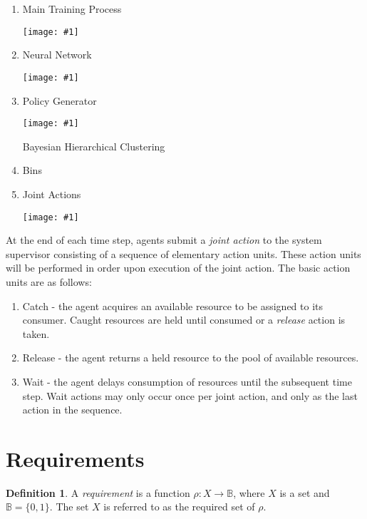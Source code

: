 \documentclass{article}
\theoremstyle{definition}
\newtheorem{definition}{Definition}[section]
\theoremstyle{remark}
\newcommand{\reqfunc}[2]{#1:#2\rightarrow\mathbb{B}}
\newcommand{\addpic}[1]{\texttt{[image: \#1]}}
\begin{document}
	\begin{enumerate}[label=\alph*.]

	\item Main Training Process

	\addpic{figures/Training-Main-Process.jpg}


	\item Neural Network


	\addpic{figures/Neural-Network.jpeg}

	\item Policy Generator

	\addpic{figures/Policy-Generator.png}

	Bayesian Hierarchical Clustering

	\item Bins

	\item Joint Actions

	\addpic{figures/Joint-action.jpg}

	\end{enumerate}

	At the end of each time step, agents submit a \emph{joint action} to the system supervisor consisting of a sequence of elementary action units. These action units will be performed in order upon execution of the joint action. The basic action units are as follows:

	\begin{enumerate}
		\item Catch - the agent acquires an available resource to be assigned to its consumer. Caught resources are held until consumed or a \emph{release} action is taken.
		\item Release - the agent returns a held resource to the pool of available resources.
		\item Wait - the agent delays consumption of resources until the subsequent time step. Wait actions may only occur once per joint action, and only as the last action in the sequence.
	\end{enumerate}

	\section{Requirements}

		\begin{definition}
			A \emph{requirement} is a function $\reqfunc{\rho}{X}$, where $X$ is a set and $\mathbb{B} = \{0,1\}$. The set $X$ is referred to as the required set of $\rho$.
		\end{definition}
\end{document}
